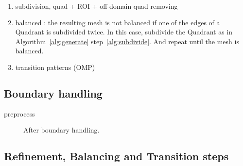 \documentclass[10pt]{article}
\begin{document}
\begin{enumerate}
\item subdivision, quad + ROI + off-domain quad removing
\item balanced : the resulting mesh is not balanced if one of the edges of a Quadrant is subdivided twice. In this case, subdivide the Quadrant as in Algorithm~\ref{alg:generate} step~\ref{alg:subdivide}. And repeat until the mesh is balanced.
\item transition patterns (OMP)
\end{enumerate}

\subsection{Boundary handling}

preprocess

 \begin{figure}[htb]
\centering
\caption{After boundary handling.}
\label{fig:boundary}
\end{figure}

\subsection{Refinement, Balancing and Transition steps}
\end{document}
